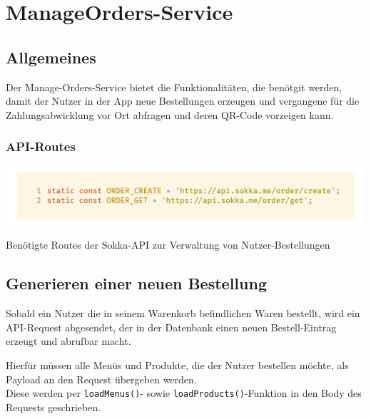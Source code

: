\section{ManageOrders-Service}

\subsection{Allgemeines}

Der Manage-Orders-Service bietet die Funktionalitäten, die benötgit werden, damit der Nutzer in der
App neue Bestellungen erzeugen und vergangene für die Zahlungsabwicklung vor Ort abfragen und
deren QR-Code vorzeigen kann.

\subsubsection{API-Routes}

\begin{code}
    \centering
    \includegraphics[width=1\textwidth]{images/Client/services/manage-orders/orderRoutes.png}
    \vspace{-25pt}
    \caption{Benötigte Routes der Sokka-API zur Verwaltung von Nutzer-Bestellungen}
\end{code}

\subsection{Generieren einer neuen Bestellung}

Sobald ein Nutzer die in seinem Warenkorb befindlichen Waren bestellt, wird ein API-Request abgesendet,
der in der Datenbank einen neuen Bestell-Eintrag erzeugt und abrufbar macht.

\newpage

Hierfür müssen alle Menüs und Produkte, die der Nutzer bestellen möchte, als Payload an den
Request übergeben werden.\\
Diese werden per \lstinline{loadMenus()}- sowie \lstinline{loadProducts()}-Funktion
in den Body des Requests geschrieben.

